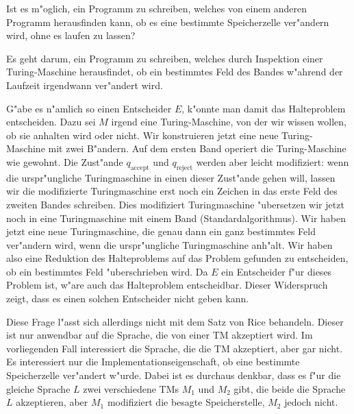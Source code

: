 Ist es m"oglich, ein Programm zu schreiben, welches von einem anderen
Programm herausfinden kann, ob es eine bestimmte Speicherzelle
ver"andern wird, ohne es laufen zu lassen?

\begin{loesung}
Es geht darum, ein Programm zu schreiben, welches durch Inspektion
einer Turing-Maschine herausfindet, ob ein bestimmtes Feld des
Bandes w"ahrend der Laufzeit irgendwann ver"andert wird.

G"abe es n"amlich so einen Entscheider $E$, k"onnte man damit das Halteproblem
entscheiden. Dazu sei $M$ irgend eine Turing-Maschine, von der wir
wissen wollen, ob sie anhalten wird oder nicht.
Wir konstruieren jetzt eine neue Turing-Maschine mit zwei
B"andern. Auf dem ersten Band operiert die Turing-Maschine
wie gewohnt.
Die Zust"ande $q_\text{accept}$ und $q_\text{reject}$ werden
aber leicht modifiziert: wenn die urspr"ungliche Turingmaschine 
in einen dieser Zust"ande gehen will, lassen wir die modifizierte
Turingmaschine erst noch ein Zeichen in das erste Feld des zweiten
Bandes schreiben. Dies modifiziert Turingmaschine "ubersetzen wir jetzt noch
in eine Turingmaschine mit einem Band (Standardalgorithmus). Wir haben
jetzt eine neue Turingmaschine, die genau dann ein ganz bestimmtes
Feld ver"andern wird, wenn die urspr"ungliche Turingmaschine
anh"alt. Wir haben also eine Reduktion des Halteproblems auf das
Problem gefunden zu entscheiden, ob ein bestimmtes Feld "uberschrieben
wird. Da $E$ ein Entscheider f"ur dieses Problem ist, w"are auch das
Halteproblem entscheidbar. Dieser Widerspruch zeigt, dass es einen
solchen Entscheider nicht geben kann.

Diese Frage l"asst sich allerdings nicht mit dem Satz von Rice 
behandeln. Dieser ist nur anwendbar auf die Sprache, die von einer
TM akzeptiert wird. Im vorliegenden Fall interessiert die Sprache,
die die TM akzeptiert, aber gar nicht.
Es interessiert nur die Implementationseigenschaft, ob eine
bestimmte Speicherzelle ver"andert w"urde.
Dabei ist es durchaus denkbar, dass es f"ur die gleiche Sprache $L$
zwei verschiedene TMs $M_1$ und $M_2$ gibt, die beide die Sprache $L$
akzeptieren, aber $M_1$ modifiziert die besagte Speicherstelle, $M_2$
jedoch nicht.
\end{loesung}
